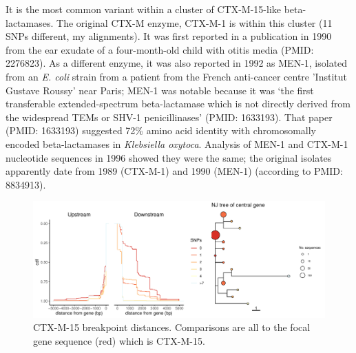 \documentclass[aps,rmp,preprint,superscriptaddress,10pt,twocolumn]{revtex4-1}
\begin{document}
It is the most common variant within a cluster of CTX-M-15-like beta-lactamases. The original CTX-M enzyme, CTX-M-1 is within this cluster (11 SNPs different, my alignments). It was first reported in a publication in 1990 from the ear exudate of a four-month-old child with otitis media (PMID: 2276823). As a different enzyme, it was also reported in 1992 as MEN-1, isolated from an \textit{E. coli} strain from a patient from the French anti-cancer centre 'Institut Gustave Roussy' near Paris; MEN-1 was notable because it was `the first transferable extended-spectrum beta-lactamase which is not directly derived from the widespread TEMs or SHV-1 penicillinases' (PMID: 1633193). That paper  (PMID: 1633193) suggested 72\% amino acid identity with chromosomally encoded beta-lactamases in \textit{Klebsiella oxytoca}. Analysis of MEN-1 and CTX-M-1 nucleotide sequences in 1996 showed they were the same; the original isolates apparently date from 1989 (CTX-M-1) and 1990 (MEN-1) (according to PMID: 8834913). 

\begin{figure}
    \centering
\includegraphics[width=\linewidth]{figs/CTX-M-15-mmseqs2-polish.all_u5000_d5000_pangraph.json.output_dists.csv.flanking-plot-output-focal-gene-seq}
    \caption{CTX-M-15 breakpoint distances. Comparisons are all to the focal gene sequence (red) which is CTX-M-15. }
    \label{fig:CTX-M-15-breakpoints}
\end{figure}
\end{document}
